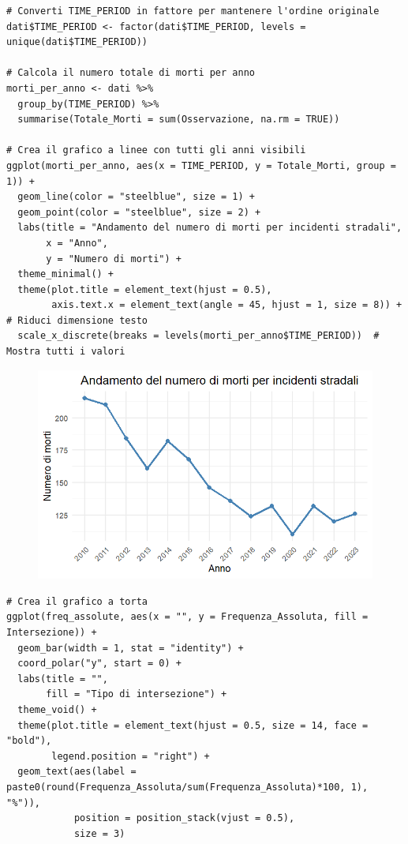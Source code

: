 \documentclass[14pt, openany, titlepage]{report} %
\begin{document}
\begin{center}
\begin{lstlisting}[breaklines=true]
# Converti TIME_PERIOD in fattore per mantenere l'ordine originale
dati$TIME_PERIOD <- factor(dati$TIME_PERIOD, levels = unique(dati$TIME_PERIOD))

# Calcola il numero totale di morti per anno
morti_per_anno <- dati %>%
  group_by(TIME_PERIOD) %>%
  summarise(Totale_Morti = sum(Osservazione, na.rm = TRUE))

# Crea il grafico a linee con tutti gli anni visibili
ggplot(morti_per_anno, aes(x = TIME_PERIOD, y = Totale_Morti, group = 1)) +
  geom_line(color = "steelblue", size = 1) +
  geom_point(color = "steelblue", size = 2) +
  labs(title = "Andamento del numero di morti per incidenti stradali",
       x = "Anno",
       y = "Numero di morti") +
  theme_minimal() +
  theme(plot.title = element_text(hjust = 0.5),
        axis.text.x = element_text(angle = 45, hjust = 1, size = 8)) +  # Riduci dimensione testo
  scale_x_discrete(breaks = levels(morti_per_anno$TIME_PERIOD))  # Mostra tutti i valori
\end{lstlisting}  
\end{center}

\begin{figure}[H] %
    \centering
    \includegraphics[width=12cm, height=7cm]{Rplot01.png} %
\end{figure}

\newpage

\begin{center}
\begin{lstlisting}[breaklines=true]
# Crea il grafico a torta
ggplot(freq_assolute, aes(x = "", y = Frequenza_Assoluta, fill = Intersezione)) +
  geom_bar(width = 1, stat = "identity") +
  coord_polar("y", start = 0) +
  labs(title = "",
       fill = "Tipo di intersezione") +
  theme_void() +
  theme(plot.title = element_text(hjust = 0.5, size = 14, face = "bold"),
        legend.position = "right") +
  geom_text(aes(label = paste0(round(Frequenza_Assoluta/sum(Frequenza_Assoluta)*100, 1), "%")), 
            position = position_stack(vjust = 0.5),
            size = 3)
\end{lstlisting}  
\end{center}
\end{document}
